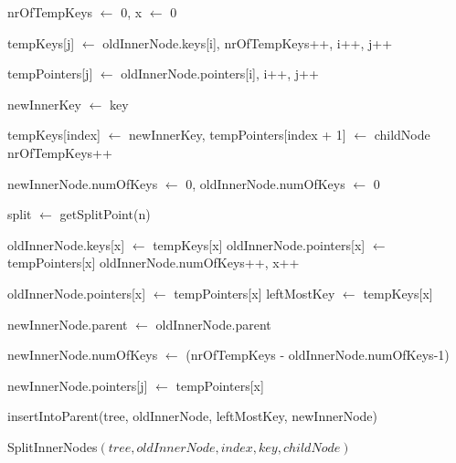 \documentclass[abstracton,12pt,oneside]{scrreprt}
\begin{document}
\begin{algorithm}[H]
	\IncMargin{1em}
	\SetAlgoLined
	\DontPrintSemicolon
	
	
	nrOfTempKeys $\leftarrow$ 0, x $\leftarrow$ 0\;
	
	 {
		tempKeys[j] $\leftarrow$ oldInnerNode.keys[i], nrOfTempKeys++, i++, j++\;
		
	}
	
	 {
		tempPointers[j] $\leftarrow$ oldInnerNode.pointers[i], i++, j++\;
	}
	
	newInnerKey $\leftarrow$ key\;
	
	tempKeys[index] $\leftarrow$ newInnerKey, tempPointers[index + 1] $\leftarrow$ childNode\;
	nrOfTempKeys++\;
	
	newInnerNode.numOfKeys $\leftarrow$ 0, oldInnerNode.numOfKeys $\leftarrow$ 0\;
	
	split $\leftarrow$ getSplitPoint(n)\;
	
	
	 {
		oldInnerNode.keys[x] $\leftarrow$ tempKeys[x]\;
		oldInnerNode.pointers[x] $\leftarrow$ tempPointers[x]\;
		oldInnerNode.numOfKeys++, x++\;
		
	}
	oldInnerNode.pointers[x] $\leftarrow$ tempPointers[x]\;
	leftMostKey $\leftarrow$ tempKeys[x]\;
	
	newInnerNode.parent $\leftarrow$ oldInnerNode.parent\;
	
	newInnerNode.numOfKeys $\leftarrow$ (nrOfTempKeys - oldInnerNode.numOfKeys-1)\;
	
	
	newInnerNode.pointers[j] $\leftarrow$  tempPointers[x]\;
	
	
	insertIntoParent(tree, oldInnerNode, leftMostKey, newInnerNode)\;
	
	
	
	\caption{SplitInnerNodes$(tree, oldInnerNode, index, key, childNode)$}	\label{SplitInnerNodes}
\end{algorithm}
\end{document}
